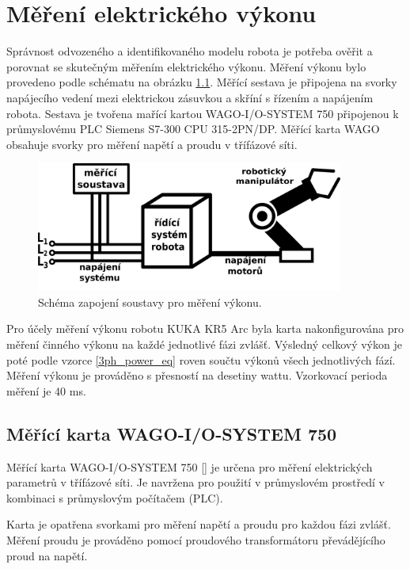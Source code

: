 \chapter{Měření elektrického výkonu}

Správnost odvozeného a identifikovaného modelu robota je potřeba ověřit a porovnat se skutečným měřením elektrického výkonu. Měření výkonu bylo provedeno podle schématu na obrázku \ref{mereni_vykonu_pic}. Měřící sestava je připojena na svorky napájecího vedení mezi elektrickou zásuvkou a skříní s řízením a napájením robota. Sestava je tvořena mařící kartou WAGO-I/O-SYSTEM 750 připojenou k průmyslovému PLC Siemens S7-300 CPU 315-2PN/DP. Měřící karta WAGO obsahuje svorky pro měření napětí a proudu v třífázové síti. 

\begin{figure}[ht]
\includegraphics[width=0.9\textwidth]{mereni_vykonu_obr}
\caption{Schéma zapojení soustavy pro měření výkonu.}
\label{mereni_vykonu_pic}
\end{figure}

Pro účely měření výkonu robotu KUKA KR5 Arc byla karta nakonfigurována pro měření činného výkonu na každé jednotlivé fázi zvlášť. Výsledný celkový výkon je poté podle vzorce \ref{3ph_power_eq} roven součtu výkonů všech jednotlivých fází. Měření výkonu je prováděno s přesností na desetiny wattu. Vzorkovací perioda měření je 40 ms. 

\section{Měřící karta WAGO-I/O-SYSTEM 750}

Měřící karta WAGO-I/O-SYSTEM 750 [\cite{wago}] je určena pro měření elektrických parametrů v třífázové síti. Je navržena pro použití v průmyslovém prostředí v kombinaci s průmyslovým počítačem (PLC). 

Karta je opatřena svorkami pro měření napětí a proudu pro každou fázi zvlášť. Měření proudu je prováděno pomocí proudového transformátoru převádějícího proud na napětí. 

